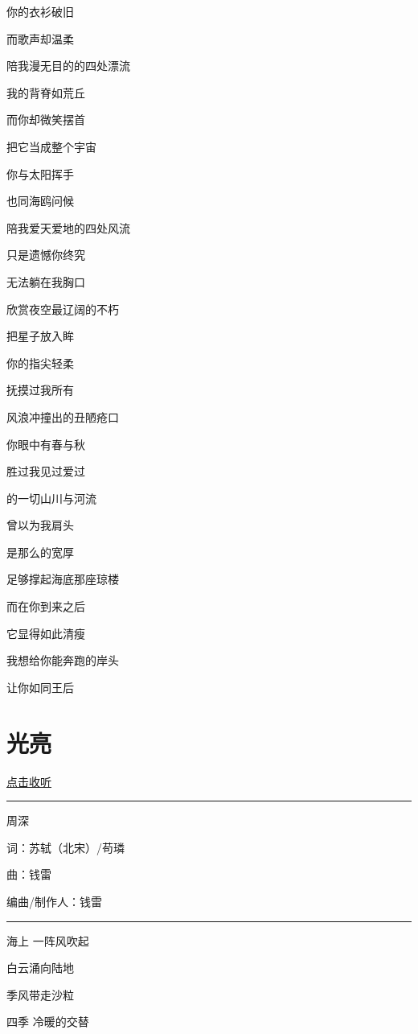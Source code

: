 \documentclass[
]{book}
\begin{document}
你的衣衫破旧

而歌声却温柔

陪我漫无目的的四处漂流

我的背脊如荒丘

而你却微笑摆首

把它当成整个宇宙

你与太阳挥手

也同海鸥问候

陪我爱天爱地的四处风流

只是遗憾你终究

无法躺在我胸口

欣赏夜空最辽阔的不朽

把星子放入眸

你的指尖轻柔

抚摸过我所有

风浪冲撞出的丑陋疮口

你眼中有春与秋

胜过我见过爱过

的一切山川与河流

曾以为我肩头

是那么的宽厚

足够撑起海底那座琼楼

而在你到来之后

它显得如此清瘦

我想给你能奔跑的岸头

让你如同王后

\section*{光亮}\label{guangliang}

\href{https://y.qq.com/n/ryqq/songDetail/001nWLsE4VJqC9}{点击收听}

\begin{center}\rule{0.5\linewidth}{0.5pt}\end{center}

周深

词：苏轼（北宋）/苟璘

曲：钱雷

编曲/制作人：钱雷

\begin{center}\rule{0.5\linewidth}{0.5pt}\end{center}

海上 一阵风吹起

白云涌向陆地

季风带走沙粒

四季 冷暖的交替
\end{document}
